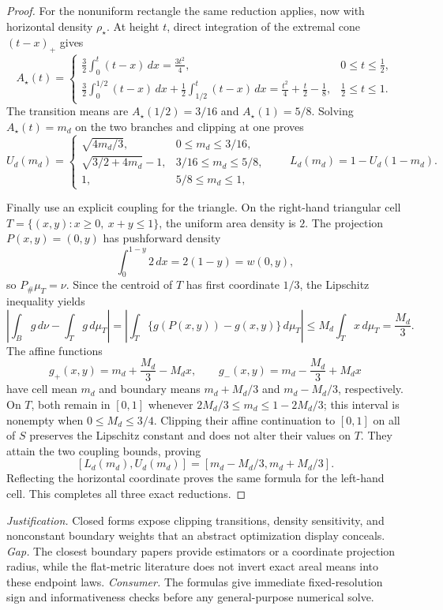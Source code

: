 \documentclass{article}
\begin{document}
\begin{proof}
For the nonuniform rectangle the same reduction applies, now with horizontal
density \(\rho_\star\).  At height \(t\), direct integration of the extremal cone
\((t-x)_+\) gives
\[
 A_\star(t)=
 \begin{cases}
 \displaystyle\frac32\int_0^t(t-x)\,dx=\frac{3t^2}{4},&0\leq t\leq\frac12,\\[6pt]
 \displaystyle\frac32\int_0^{1/2}(t-x)\,dx
 +\frac12\int_{1/2}^{t}(t-x)\,dx
 =\frac{t^2}{4}+\frac t2-\frac18,&\frac12\leq t\leq1.
 \end{cases}
\]
The transition means are \(A_\star(1/2)=3/16\) and
\(A_\star(1)=5/8\).  Solving \(A_\star(t)=m_d\) on the two branches and clipping
at one proves
\[
U_d(m_d)=\begin{cases}
\sqrt{4m_d/3},&0\leq m_d\leq3/16,\\
\sqrt{3/2+4m_d}-1,&3/16\leq m_d\leq5/8,\\
1,&5/8\leq m_d\leq1,
\end{cases}
\qquad L_d(m_d)=1-U_d(1-m_d).
\]

Finally use an explicit coupling for the triangle.  On the right-hand triangular
cell \(T=\{(x,y):x\geq0,\ x+y\leq1\}\), the uniform area density is \(2\).  The
projection \(P(x,y)=(0,y)\) has pushforward density
\[
 \int_0^{1-y}2\,dx=2(1-y)=w(0,y),
\]
so \(P_\#\mu_T=\nu\).  Since the centroid of \(T\) has first coordinate \(1/3\),
the Lipschitz inequality yields
\[
 \left|\int_Bg\,d\nu-\int_Tg\,d\mu_T\right|
 =\left|\int_T\{g(P(x,y))-g(x,y)\}\,d\mu_T\right|
 \leq M_d\int_Tx\,d\mu_T=\frac{M_d}{3}.
\]
The affine functions
\[
 g_+(x,y)=m_d+\frac{M_d}{3}-M_dx,
 \qquad
 g_-(x,y)=m_d-\frac{M_d}{3}+M_dx
\]
have cell mean \(m_d\) and boundary means \(m_d+M_d/3\) and
\(m_d-M_d/3\), respectively.  On \(T\), both remain in \([0,1]\) whenever
\(2M_d/3\leq m_d\leq1-2M_d/3\); this interval is nonempty when
\(0\leq M_d\leq3/4\).  Clipping their affine continuation to \([0,1]\) on all
of \(S\) preserves the Lipschitz constant and does not alter their values on
\(T\).  They attain the two coupling bounds, proving
\[
 [L_d(m_d),U_d(m_d)]=[m_d-M_d/3,m_d+M_d/3].
\]
Reflecting the horizontal coordinate proves the same formula for the left-hand
cell.  This completes all three exact reductions.
\end{proof}
\par\smallskip\noindent \textit{Justification.} Closed forms expose clipping transitions, density sensitivity, and nonconstant boundary weights that an abstract optimization display conceals. \textit{Gap.} The closest boundary papers provide estimators or a coordinate projection radius, while the flat-metric literature does not invert exact areal means into these endpoint laws. \textit{Consumer.} The formulas give immediate fixed-resolution sign and informativeness checks before any general-purpose numerical solve.
\end{document}

